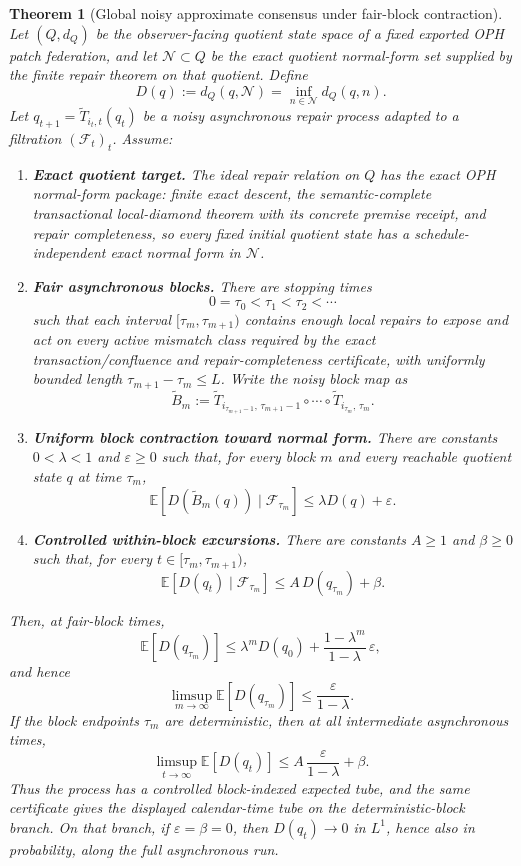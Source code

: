 \documentclass[11pt]{article}
\newtheorem{theorem}{Theorem}[section]
\theoremstyle{remark}
\theoremstyle{plain}
\begin{document}
\begin{theorem}[Global noisy approximate consensus under fair-block contraction]
\label{thm:noisy-fair-block-consensus}
Let \((Q,d_Q)\) be the observer-facing quotient state space of a fixed exported OPH patch
federation, and let \(\mathcal N\subset Q\) be the exact quotient normal-form set supplied by the
finite repair theorem on that quotient. Define
\[
D(q):=d_Q(q,\mathcal N)=\inf_{n\in\mathcal N}d_Q(q,n).
\]
Let \(q_{t+1}=\widetilde T_{i_t,t}(q_t)\) be a noisy asynchronous repair process adapted to a
filtration \((\mathcal F_t)_t\). Assume:
\begin{enumerate}[(G1)]
\item \textbf{Exact quotient target.} The ideal repair relation on \(Q\) has the exact OPH
normal-form package: finite exact descent, the semantic-complete transactional local-diamond
theorem with its concrete premise receipt, and repair
completeness, so every fixed initial quotient state has a schedule-independent exact normal form
in \(\mathcal N\).
\item \textbf{Fair asynchronous blocks.} There are stopping times
\[
0=\tau_0<\tau_1<\tau_2<\cdots
\]
such that each interval \([\tau_m,\tau_{m+1})\) contains enough local repairs to expose and act on
every active mismatch class required by the exact transaction/confluence and repair-completeness
certificate, with uniformly bounded length \(\tau_{m+1}-\tau_m\le L\). Write the noisy block map
as
\[
\widetilde B_m
:=
\widetilde T_{i_{\tau_{m+1}-1},\,\tau_{m+1}-1}
\circ\cdots\circ
\widetilde T_{i_{\tau_m},\,\tau_m}.
\]
\item \textbf{Uniform block contraction toward normal form.} There are constants
\(0<\lambda<1\) and \(\varepsilon\ge0\) such that, for every block \(m\) and every reachable
quotient state \(q\) at time \(\tau_m\),
\[
\mathbb E\!\left[
D\!\left(\widetilde B_m(q)\right)
\mid \mathcal F_{\tau_m}
\right]
\le
\lambda D(q)+\varepsilon.
\]
\item \textbf{Controlled within-block excursions.} There are constants \(A\ge1\) and
\(\beta\ge0\) such that, for every \(t\in[\tau_m,\tau_{m+1})\),
\[
\mathbb E\!\left[
D(q_t)\mid \mathcal F_{\tau_m}
\right]
\le
A\,D(q_{\tau_m})+\beta.
\]
\end{enumerate}
Then, at fair-block times,
\[
\mathbb E[D(q_{\tau_m})]
\le
\lambda^mD(q_0)
+
\frac{1-\lambda^m}{1-\lambda}\,\varepsilon,
\]
and hence
\[
\limsup_{m\to\infty}\mathbb E[D(q_{\tau_m})]
\le
\frac{\varepsilon}{1-\lambda}.
\]
If the block endpoints \(\tau_m\) are deterministic, then at all intermediate
asynchronous times,
\[
\limsup_{t\to\infty}\mathbb E[D(q_t)]
\le
A\,\frac{\varepsilon}{1-\lambda}+\beta.
\]
Thus the process has a controlled block-indexed expected tube, and the same
certificate gives the displayed calendar-time tube on the deterministic-block
branch. On that branch, if \(\varepsilon=\beta=0\), then \(D(q_t)\to0\) in
\(L^1\), hence also in probability, along the full asynchronous run.
\end{theorem}
\end{document}
